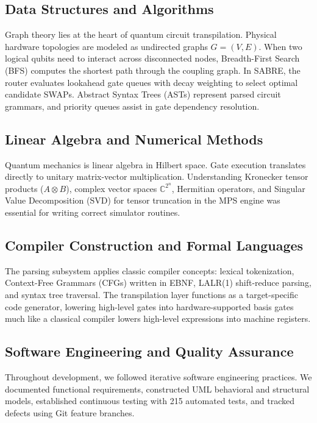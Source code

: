 \subsection{Data Structures and Algorithms}
Graph theory lies at the heart of quantum circuit transpilation. Physical hardware topologies are modeled as undirected graphs $G=(V, E)$. When two logical qubits need to interact across disconnected nodes, Breadth-First Search (BFS) computes the shortest path through the coupling graph. In SABRE, the router evaluates lookahead gate queues with decay weighting to select optimal candidate SWAPs. Abstract Syntax Trees (ASTs) represent parsed circuit grammars, and priority queues assist in gate dependency resolution.

\subsection{Linear Algebra and Numerical Methods}
Quantum mechanics is linear algebra in Hilbert space. Gate execution translates directly to unitary matrix-vector multiplication. Understanding Kronecker tensor products ($A \otimes B$), complex vector spaces $\mathbb{C}^{2^n}$, Hermitian operators, and Singular Value Decomposition (SVD) for tensor truncation in the MPS engine was essential for writing correct simulator routines.

\subsection{Compiler Construction and Formal Languages}
The parsing subsystem applies classic compiler concepts: lexical tokenization, Context-Free Grammars (CFGs) written in EBNF, LALR(1) shift-reduce parsing, and syntax tree traversal. The transpilation layer functions as a target-specific code generator, lowering high-level gates into hardware-supported basis gates much like a classical compiler lowers high-level expressions into machine registers.

\subsection{Software Engineering and Quality Assurance}
Throughout development, we followed iterative software engineering practices. We documented functional requirements, constructed UML behavioral and structural models, established continuous testing with 215 automated tests, and tracked defects using Git feature branches.


